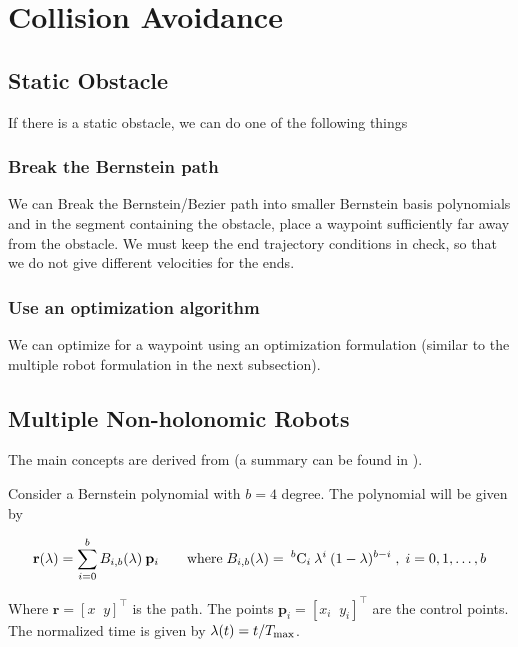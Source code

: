 \section{Collision Avoidance}

\subsection{Static Obstacle}

If there is a static obstacle, we can do one of the following things

\subsubsection{Break the Bernstein path} 

We can Break the Bernstein/Bezier path into smaller Bernstein basis polynomials and in the segment containing the obstacle, place a waypoint sufficiently far away from the obstacle. We must keep the end trajectory conditions in check, so that we do not give different velocities for the ends. 

\subsubsection{Use an optimization algorithm}

We can optimize for a waypoint using an optimization formulation (similar to the multiple robot formulation in the next subsection).

\subsection{Multiple Non-holonomic Robots}

The main concepts are derived from \cite{klanvcar2010case} (a summary can be found in \cite{skrjanc2007cooperative}).

Consider a Bernstein polynomial with $b = 4$ degree. The polynomial will be given by

\begin{equation}
    \mathbf{r}(\lambda) = \sum_{i=0}^{b} B_{i, b} (\lambda) \: \mathbf{p}_i \qquad \textup{where} \; B_{i, b} (\lambda) = \: ^{b}\textup{C}_i \: \lambda^i \: (1-\lambda)^{b-i} \;,\; i = 0, 1, \dots, b
\end{equation}

Where $\mathbf{r} = [x\;\;y]^\top$ is the path. The points $\mathbf{p}_i = [x_i\;\;y_i]^\top$ are the control points.
The normalized time is given by $\lambda(t) = t/T_{\textup{max}}$.

